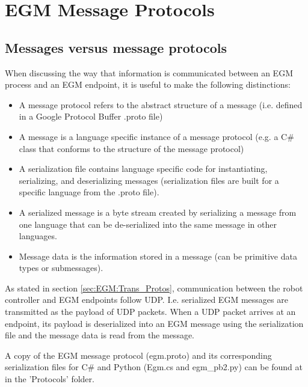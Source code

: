 \documentclass{cslthse-msc}
\begin{document}
\newpage
\section{EGM Message Protocols}
\label{sec:EGM:Message_Protos}

\subsection{Messages versus message protocols}
\label{sec:EGM:Message_Protos:message_v_protocol}
When discussing the way that information is communicated between an EGM process and an EGM endpoint, it is useful to make the following distinctions: 
\begin{itemize}
    \item A message protocol refers to the abstract structure of a message (i.e. defined in a Google Protocol Buffer .proto file)
    \item A message is a language specific instance of a message protocol (e.g. a C\# class that conforms to the structure of the message protocol)
    \item A serialization file contains language specific code for instantiating, serializing, and deserializing messages (serialization files are built for a specific language from the .proto file).
    \item A serialized message is a byte stream created by serializing a message from one language that can be de-serialized into the same message in other languages.
    \item Message data is the information stored in a message (can be primitive data types or submessages).
\end{itemize}
As stated in section \ref{sec:EGM:Trans_Protos}, communication between the robot controller and EGM endpoints follow UDP. I.e. serialized EGM messages are transmitted as the payload of UDP packets. When a UDP packet arrives at an endpoint, its payload is deserialized into an EGM message using the serialization file and the message data is read from the message. \par

A copy of the EGM message protocol (egm.proto) and its corresponding serialization files for C\# and Python (Egm.cs and egm\_pb2.py) can be found at \cite{Greg:Ref_Repo} in the 'Protocols' folder. 
\end{document}
